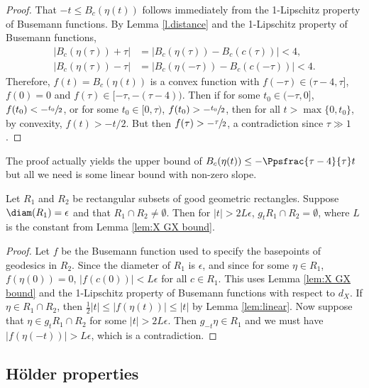 \begin{proof}
That $-t \leq B_{c}(\eta(t))$ follows immediately from the 1-Lipschitz property of Busemann functions. By Lemma \ref{l.distance} and the 1-Lipschitz property of Busemann functions,
\begin{align*}
|B_{c}(\eta(\tau)) + \tau | &= | B_{c}(\eta(\tau)) - B_{c}(c(\tau)) | < 4,\\ \tag*{and similarly} |B_{c}(\eta(\tau)) - \tau | &= | B_{c}(\eta(-\tau)) - B_{c}(c(-\tau)) | < 4. 
\end{align*}
Therefore, $f(t) = B_{c}(\eta(t))$ is a convex function with $f(-\tau)\in (\tau-4,\tau]$, $f(0)=0$ and $f(\tau) \in [-\tau,-(\tau-4))$. Then if for some $t_0 \in (-\tau,0]$, $f(t_0) < -\sfrac{t_0}{2}$, or for some $t_0 \in [0,\tau)$, $f(t_0)>-\sfrac{t_0}{2}$, then for all $t>\max\{0,t_0\}$, by convexity, $f(t) > -t/2$. But then $f(\tau) > -\sfrac{\tau}{2}$, a contradiction since $\tau\gg 1$.
\end{proof}

The proof actually yields the upper bound of $B_{c}(\eta(t)) \leq - \Ppsfrac{\tau-4}{\tau} t$ but all we need is some linear bound with non-zero slope.

\begin{lem}\label{lem:deform tool}
Let $R_1$ and $R_2$ be rectangular subsets of good geometric rectangles. Suppose $\diam(R_1) = \epsilon$ and that $R_1 \cap R_2 \neq \emptyset$. Then for $|t|>2L\epsilon$, $g_tR_1 \cap R_2 = \emptyset$, where $L$ is the constant from Lemma \ref{lem:X GX bound}.
\end{lem}

\begin{proof}
Let $f$ be the Busemann function used to specify the basepoints of geodesics in $R_2$. Since the diameter of $R_1$ is $\epsilon$, and since for some $\eta\in R_1$, $f(\eta(0))=0$, $|f(c(0))| < L\epsilon$ for all $c\in R_1$. This uses Lemma \ref{lem:X GX bound} and the 1-Lipschitz property of Busemann functions with respect to $d_X$. If $\eta \in R_1 \cap R_2$, then $\frac{1}{2}|t| \leq |f(\eta(t))| \leq |t|$ by Lemma \ref{lem:linear}. Now suppose that $\eta \in g_tR_1 \cap R_2$ for some $|t|>2L\epsilon$. Then $g_{-t}\eta \in R_1$ and we must have $|f(\eta(-t))| > L\epsilon$, which is a contradiction.
\end{proof}

\subsection{Hölder properties}

